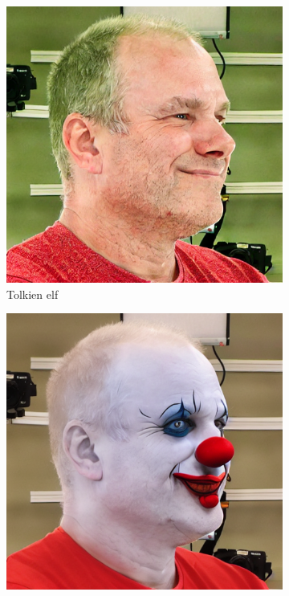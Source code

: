 \begin{figure}[ht]
\begin{subfigure}{0.18\linewidth}
        \includegraphics[width=\textwidth]{Figures/naive/low_cfg/ipix2pix_sven_elf/0-4-5-1-5648_230239_266.png}
        \caption{Tolkien elf}
	\end{subfigure}
    \begin{subfigure}{0.18\linewidth}
        \includegraphics[width=\textwidth]{Figures/naive/default/ipix2pix_sven_clown/0-4-5-1-5648_230239_266.png}

\end{subfigure}
\end{figure}
